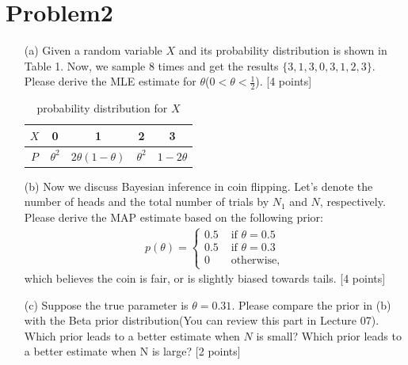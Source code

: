 \documentclass[10pt]{article}
\begin{document}
\section{Problem2}

\begin{enumerate}
    \item[(a)] 
    Given a random variable $X$ and its probability distribution is shown in Table 1. Now, we sample 8 times and get the results $\{3,1,3,0,3,1,2,3\}$. Please derive the MLE estimate for $\theta$($0 < \theta < \frac{1}{2}$). {\color{red} [4 points]} \\
    \begin{table}[t]
      \caption{probability distribution for $X$}
      \label{table1}
      \centering
      \begin{tabular}{c|c|c|c|c}
        \hline
        $X$ & 0 & 1 & 2 & 3 \\ \hline
        $P$ & $\theta^{2}$ & $2\theta(1-\theta)$ & $\theta^{2}$ & $1-2\theta$ \\
        \hline
      \end{tabular}
    \end{table}
    
    \item[(b)]
    Now we discuss Bayesian inference in coin flipping. Let's denote the number of heads and the total number of trials by $N_1$ and $N$, respectively. Please derive the MAP estimate based on the following prior:
    \begin{align*}
        p(\theta)=\left\{\begin{array}{ll}
        0.5 & \text { if } \theta=0.5 \\
        0.5 & \text { if } \theta=0.3 \\
        0   & \text { otherwise,}
        \end{array}\right.
    \end{align*}
    which believes the coin is fair, or is slightly biased towards tails. {\color{red} [4 points]} \\
    
    \item[(c)]
    Suppose the true parameter is $\theta = 0.31$. Please compare the prior in (b) with the Beta prior distribution(You can review this part in Lecture 07). Which prior leads to a better estimate when $N$ is small? Which prior leads to a better estimate when N is large? {\color{red} [2 points]} \\

\end{enumerate}
\newpage
\end{document}
